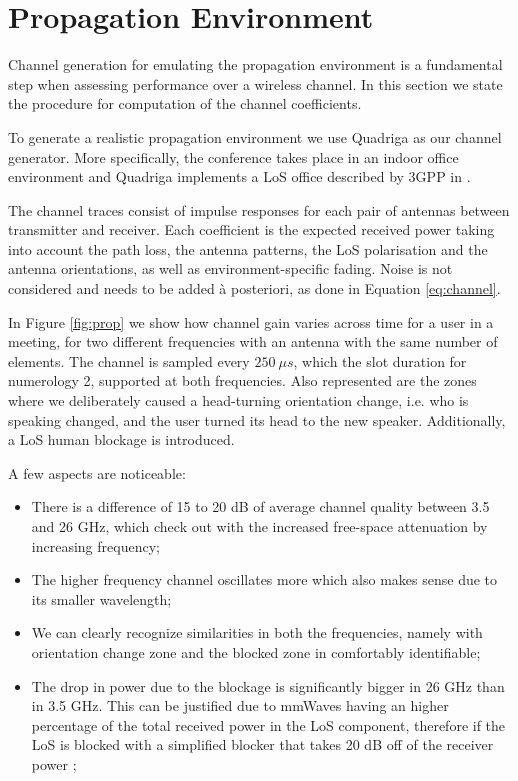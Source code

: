 \section{Propagation Environment}
\label{sec:propagation_environment}

Channel generation for emulating the propagation environment is a fundamental step when assessing performance over a wireless channel. In this section we state the procedure for computation of the channel coefficients. 

To generate a realistic propagation environment we use Quadriga as our channel generator. More specifically, the conference takes place in an indoor office environment and Quadriga implements a LoS office described by 3GPP in \cite{3gpp_antennas}. 

The channel traces consist of impulse responses for each pair of antennas between transmitter and receiver. Each coefficient is the expected received power taking into account the path loss, the antenna patterns, the LoS polarisation and the antenna orientations, as well as environment-specific fading. Noise is not considered and needs to be added à posteriori, as done in Equation \ref{eq:channel}.

In Figure \ref{fig:prop} we show how channel gain varies across time for a user in a meeting, for two different frequencies with an antenna with the same number of elements. The channel is sampled every $250 \ \mu s$, which the slot duration for numerology 2, supported at both frequencies. Also represented are the zones where we deliberately caused a head-turning orientation change, i.e. who is speaking changed, and the user turned its head to the new speaker. Additionally, a LoS human blockage is introduced.


A few aspects are noticeable:

\begin{itemize}
    \item There is a difference of 15 to 20 dB of average channel quality between 3.5 and 26 GHz, which check out with the increased free-space attenuation by increasing frequency;
    \item The higher frequency channel oscillates more which also makes sense due to its smaller wavelength;
    \item We can clearly recognize similarities in both the frequencies, namely with orientation change zone and the blocked zone in comfortably identifiable;
    \item The drop in power due to the blockage is significantly bigger in 26 GHz than in 3.5 GHz. This can be justified due to mmWaves having an higher percentage of the total received power in the LoS component, therefore if the LoS is blocked with a simplified blocker that takes 20 dB off of the receiver power \cite{20db_attenuation};
\end{itemize}


